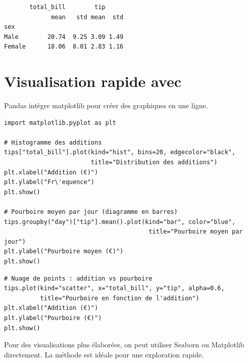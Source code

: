 \begin{codeoutput}
\begin{verbatim}
       total_bill        tip
             mean   std mean  std
sex
Male        20.74  9.25 3.09 1.49
Female      18.06  8.01 2.83 1.16
\end{verbatim}
\end{codeoutput}

\section{Visualisation rapide avec }

Pandas int\`egre matplotlib pour cr\'eer des graphiques en une ligne.

\begin{codeblock}[title=\textbf{Python}]
\begin{verbatim}
import matplotlib.pyplot as plt

# Histogramme des additions
tips["total_bill"].plot(kind="hist", bins=20, edgecolor="black",
                        title="Distribution des additions")
plt.xlabel("Addition (€)")
plt.ylabel("Fr\'equence")
plt.show()

# Pourboire moyen par jour (diagramme en barres)
tips.groupby("day")["tip"].mean().plot(kind="bar", color="blue",
                                        title="Pourboire moyen par jour")
plt.ylabel("Pourboire moyen (€)")
plt.show()
\end{verbatim}
\end{codeblock}

\begin{codeblock}[title=\textbf{Python}]
\begin{verbatim}
# Nuage de points : addition vs pourboire
tips.plot(kind="scatter", x="total_bill", y="tip", alpha=0.6,
          title="Pourboire en fonction de l'addition")
plt.xlabel("Addition (€)")
plt.ylabel("Pourboire (€)")
plt.show()
\end{verbatim}
\end{codeblock}

\begin{remarque}
Pour des visualisations plus \'elabor\'ees, on peut utiliser Seaborn ou Matplotlib
directement. La m\'ethode  est id\'eale pour une exploration rapide.
\end{remarque}

